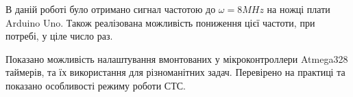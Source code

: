 
В даній роботі було отримано сигнал частотою до $\omega = 8 MHz$ на ножці плати Arduino Uno. Також реалізована можливість пониження цієї частоти, при потребі, у ціле число раз.

Показано можливість налаштування вмонтованих у мікроконтроллери Atmega328  таймерів, та їх використання для різноманітних задач. Перевірено на практиці та показано особливості режиму роботи СТС.